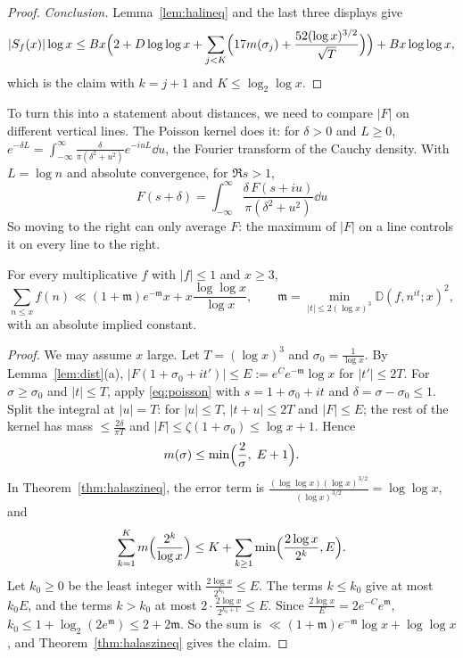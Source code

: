 \begin{proof}
\emph{Conclusion.} Lemma~\ref{lem:halineq} and the last three displays give
\[
|S_f(x)|\log x\le Bx\Bigl(2+D\log\log x+\sum_{j<K}\Bigl(17m(\sigma_j)+\frac{52(\log x)^{3/2}}{\sqrt T}\Bigr)\Bigr)+Bx\log\log x,
\]
which is the claim with $k=j+1$ and $K\le\log_2\log x$.
\end{proof}

To turn this into a statement about distances, we need to compare $|F|$ on different vertical lines. The Poisson kernel does it: for $\delta>0$ and $L\ge0$, $e^{-\delta L}=\int_{-\infty}^\infty\frac{\delta}{\pi(\delta^2+u^2)}e^{-iuL}\dd u$, the Fourier transform of the Cauchy density. With $L=\log n$ and absolute convergence, for $\Re s>1$,
\begin{equation}\label{eq:poisson}
F(s+\delta)=\int_{-\infty}^\infty\frac{\delta\,F(s+iu)}{\pi(\delta^2+u^2)}\dd u
\end{equation}
So moving to the right can only average $F$: the maximum of $|F|$ on a line controls it on every line to the right.

\begin{theorem}[Halász, 1968]\label{thm:halasz}
For every multiplicative $f$ with $|f|\le1$ and $x\ge3$,
\[
\sum_{n\le x}f(n)\ll(1+\mathfrak m)e^{-\mathfrak m}x+x\frac{\log\log x}{\log x},\qquad\mathfrak m=\min_{|t|\le2(\log x)^3}\mathbb D(f,n^{it};x)^2,
\]
with an absolute implied constant.
\end{theorem}
\begin{proof}
We may assume $x$ large. Let $T=(\log x)^3$ and $\sigma_0=\frac1{\log x}$. By Lemma~\ref{lem:dist}(a), $|F(1+\sigma_0+it')|\le E:=e^C e^{-\mathfrak m}\log x$ for $|t'|\le2T$. For $\sigma\ge\sigma_0$ and $|t|\le T$, apply \eqref{eq:poisson} with $s=1+\sigma_0+it$ and $\delta=\sigma-\sigma_0\le1$. Split the integral at $|u|=T$: for $|u|\le T$, $|t+u|\le2T$ and $|F|\le E$; the rest of the kernel has mass $\le\frac{2\delta}{\pi T}$ and $|F|\le\zeta(1+\sigma_0)\le\log x+1$. Hence
\[
m(\sigma)\le\min\Bigl(\frac2\sigma,\;E+1\Bigr).
\]
In Theorem~\ref{thm:halaszineq}, the error term is $\frac{(\log\log x)(\log x)^{3/2}}{(\log x)^{3/2}}=\log\log x$, and
\[
\sum_{k=1}^Km\Bigl(\frac{2^k}{\log x}\Bigr)\le K+\sum_{k\ge1}\min\Bigl(\frac{2\log x}{2^k},E\Bigr).
\]
Let $k_0\ge0$ be the least integer with $\frac{2\log x}{2^{k_0}}\le E$. The terms $k\le k_0$ give at most $k_0E$, and the terms $k>k_0$ at most $2\cdot\frac{2\log x}{2^{k_0+1}}\le E$. Since $\frac{2\log x}E=2e^{-C}e^{\mathfrak m}$, $k_0\le1+\log_2(2e^{\mathfrak m})\le2+2\mathfrak m$. So the sum is $\ll(1+\mathfrak m)e^{-\mathfrak m}\log x+\log\log x$, and Theorem~\ref{thm:halaszineq} gives the claim.
\end{proof}

